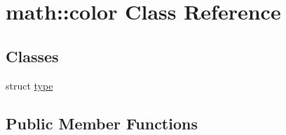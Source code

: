 \hypertarget{classmath_1_1color}{
\section{math::color Class Reference}
\label{classmath_1_1color}
}
\subsection*{Classes}
\begin{DoxyCompactItemize}
\item 
struct \hyperlink{structmath_1_1color_1_1type}{type}
\end{DoxyCompactItemize}
\subsection*{Public Member Functions}
